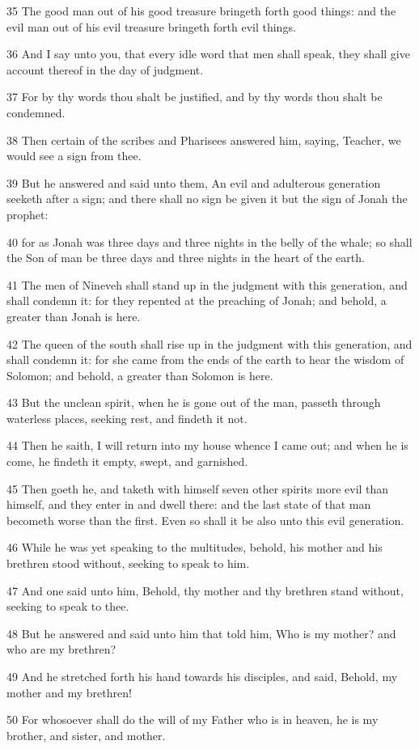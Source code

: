 \par 35 The good man out of his good treasure bringeth forth good things: and the evil man out of his evil treasure bringeth forth evil things.
\par 36 And I say unto you, that every idle word that men shall speak, they shall give account thereof in the day of judgment.
\par 37 For by thy words thou shalt be justified, and by thy words thou shalt be condemned.
\par 38 Then certain of the scribes and Pharisees answered him, saying, Teacher, we would see a sign from thee.
\par 39 But he answered and said unto them, An evil and adulterous generation seeketh after a sign; and there shall no sign be given it but the sign of Jonah the prophet:
\par 40 for as Jonah was three days and three nights in the belly of the whale; so shall the Son of man be three days and three nights in the heart of the earth.
\par 41 The men of Nineveh shall stand up in the judgment with this generation, and shall condemn it: for they repented at the preaching of Jonah; and behold, a greater than Jonah is here.
\par 42 The queen of the south shall rise up in the judgment with this generation, and shall condemn it: for she came from the ends of the earth to hear the wisdom of Solomon; and behold, a greater than Solomon is here.
\par 43 But the unclean spirit, when he is gone out of the man, passeth through waterless places, seeking rest, and findeth it not.
\par 44 Then he saith, I will return into my house whence I came out; and when he is come, he findeth it empty, swept, and garnished.
\par 45 Then goeth he, and taketh with himself seven other spirits more evil than himself, and they enter in and dwell there: and the last state of that man becometh worse than the first. Even so shall it be also unto this evil generation.
\par 46 While he was yet speaking to the multitudes, behold, his mother and his brethren stood without, seeking to speak to him.
\par 47 And one said unto him, Behold, thy mother and thy brethren stand without, seeking to speak to thee.
\par 48 But he answered and said unto him that told him, Who is my mother? and who are my brethren?
\par 49 And he stretched forth his hand towards his disciples, and said, Behold, my mother and my brethren!
\par 50 For whosoever shall do the will of my Father who is in heaven, he is my brother, and sister, and mother.

